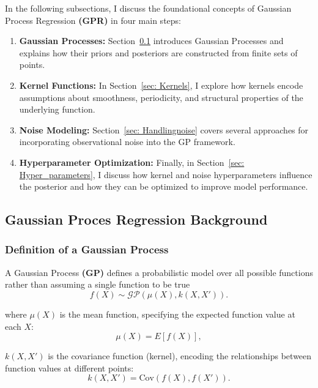\documentclass{article}
\begin{document}
In the following subsections, I discuss the foundational concepts of Gaussian Process Regression \textbf{(GPR)} in four main steps:
\begin{enumerate}
    \item \textbf{Gaussian Processes:} Section~\ref{sec: GP_backgroound} introduces Gaussian Processes and explains how their priors and posteriors are constructed from finite sets of points.
    \item \textbf{Kernel Functions:} In Section~\ref{sec: Kernels}, I explore how kernels encode assumptions about smoothness, periodicity, and structural properties of the underlying function.
    \item \textbf{Noise Modeling:} Section~\ref{sec: Handlingnoise} covers several approaches for incorporating observational noise into the GP framework.
    \item \textbf{Hyperparameter Optimization:} Finally, in Section~\ref{sec: Hyper_parameters}, I discuss how kernel and noise hyperparameters influence the posterior and how they can be optimized to improve model performance.
\end{enumerate}

\subsection{Gaussian Proces Regression Background}
\label{sec: GP_backgroound}

\subsubsection*{Definition of a Gaussian Process}
\label{sec: Definition_of_GP}

A Gaussian Process \textbf{(GP)} defines a probabilistic model over all possible functions rather than assuming a single function to be true
\begin{equation}
f(X) \sim \mathcal{GP} (\mu(X), k(X, X')).
\label{eq: Initial_GP_distribution}
\end{equation}

\noindent
where \( \mu(X) \) is the mean function, specifying the expected function value at each \( X \):
\begin{equation}
    \mu(X) = {E}[f(X)],
    \label{eq: meandef}
\end{equation}

\noindent
 \( k(X, X') \) is the covariance function (kernel), encoding the relationships between function values at different points:
\begin{equation}
    k(X, X') = \text{Cov}(f(X), f(X')).
    \label{eq: kerneldef}
\end{equation}
\end{document}
